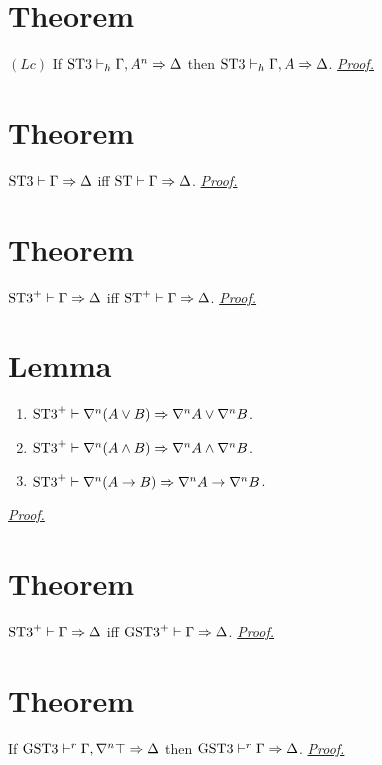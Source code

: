 \documentclass[a4paper, 12pt]{paper}
\begin{document}
\section{Theorem}\label{thm:stt-lc-elim} $(Lc)$ If $\text{ST3} \vdash_h \Gamma, A^n \Rightarrow \Delta$ then $\text{ST3} \vdash_h \Gamma, A \Rightarrow \Delta$.
\hyperref[pr:stt-lc-elim]{\emph{Proof.}}



\section{Theorem}\label{thm:stt-eq-st} $\text{ST3} \vdash \Gamma \Rightarrow \Delta$ iff $\text{ST} \vdash \Gamma \Rightarrow \Delta$.
\hyperref[pr:stt-eq-st]{\emph{Proof.}}



\section{Theorem}\label{thm:sttp-eq-stp} $\text{ST3}^+ \vdash \Gamma \Rightarrow \Delta$ iff $\text{ST}^+ \vdash \Gamma \Rightarrow \Delta$.
\hyperref[pr:sttp-eq-stp]{\emph{Proof.}}



\section{Lemma}\label{lem:l-nabla-dist}
\begin{enumerate}
  \item $\text{ST3}^+ \vdash \nabla^n (A \vee B) \Rightarrow \nabla^n A \vee \nabla^n B$.

  \item $\text{ST3}^+ \vdash \nabla^n (A \wedge B) \Rightarrow \nabla^n A \wedge \nabla^n B$. 

  \item $\text{ST3}^+ \vdash \nabla^n (A \rightarrow B) \Rightarrow \nabla^n A \rightarrow \nabla^n B$.
\end{enumerate}
\hyperref[pr:l-nabla-dist]{\emph{Proof.}}



\section{Theorem}\label{thm:sttp-eq-gsttp} $\text{ST3}^+ \vdash \Gamma \Rightarrow \Delta$ iff $\text{GST3}^+ \vdash \Gamma \Rightarrow \Delta$. \hyperref[pr:sttp-eq-gsttp]{\emph{Proof.}}



\section{Theorem}\label{lem:gstt-top-redundant}
If $\text{GST3} \vdash^r \Gamma , \nabla^n \top \Rightarrow \Delta$ then $\text{GST3} \vdash^r \Gamma \Rightarrow \Delta$.
\hyperref[pr:gstt-top-redundant]{\emph{Proof.}}
\end{document}
